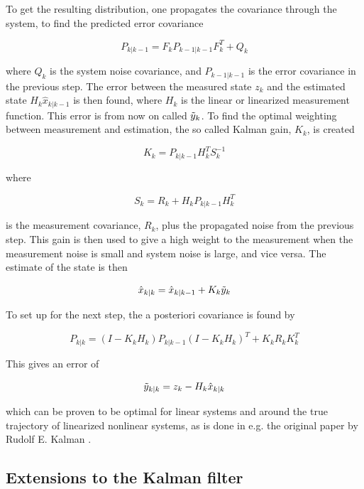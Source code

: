 To get the resulting distribution, one propagates the covariance through the system, to find the predicted error covariance

\begin{equation}
    P_{k|k-1} = F_k P_{k-1|k-1} F^T_{k} + Q_k
\end{equation}

where $Q_k$ is the system noise covariance, and $P_{k-1|k-1}$ is the error covariance in the previous step. The error between the measured state $z_k$ and the estimated state $H_k \hat{x}_{k|k-1}$ is then found, where $H_k$ is the linear or linearized measurement function. This error is from now on called $\Tilde{y}_k$. To find the optimal weighting between measurement and estimation, the so called Kalman gain, $K_k$, is created

\begin{equation}
    K_k = P_{k|k-1}H^T_kS^{-1}_k
\end{equation}

where 

\begin{equation}
    S_k = R_k + H_kP_{k|k-1}H^T_k
\end{equation}

is the measurement covariance, $R_k$, plus the propagated noise from the previous step. This gain is then used to give a high weight to the measurement when the measurement noise is small and system noise is large, and vice versa. The estimate of the state is then

\begin{equation}
    \hat{x}_{k|k} = \hat{x}_{k|k-1} + K_k\Tilde{y}_k
\end{equation}

To set up for the next step, the a posteriori covariance is found by

\begin{equation}
    P_{k|k} = (I-K_kH_k)P_{k|k-1}(I-K_kH_k)^T + K_kR_kK^T_k
\end{equation}

This gives an error of 

\begin{equation}
    \Tilde{y}_{k|k} = z_k - H_k\hat{x}_{k|k}
\end{equation}

which can be proven to be optimal for linear systems and around the true trajectory of linearized nonlinear systems, as is done in e.g. the original paper by Rudolf E. Kalman \cite{kalmanOG}.

\subsection{Extensions to the Kalman filter}

